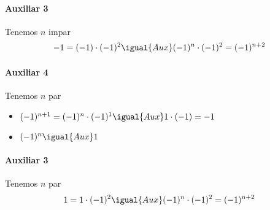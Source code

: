 \begin{enumerate}[label=\roman*)]
        \paragraph{Auxiliar 3}{
          Tenemos $n$ impar
          \begin{align*}
            -1 = (-1) \cdot (-1)^2 \igual{Aux} (-1)^n \cdot (-1)^2 = (-1)^{n+2}
          \end{align*}
        }

        \paragraph{Auxiliar 4}{
          Tenemos $n$ par
          \begin{itemize}
            \item $(-1)^{n+1} = (-1)^n \cdot (-1)^1 \igual{Aux} 1 \cdot (-1) = -1$
            \item $(-1)^n \igual{Aux} 1$
          \end{itemize}
        }

        \paragraph{Auxiliar 3}{
          Tenemos $n$ par
          \begin{align*}
            1 = 1 \cdot (-1)^2 \igual{Aux} (-1)^n \cdot (-1)^2 = (-1)^{n+2}
          \end{align*}
        }
        

\end{enumerate}

